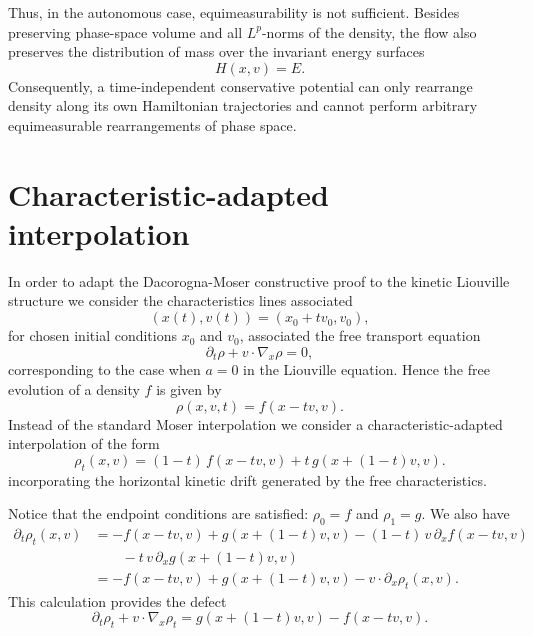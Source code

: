 \documentclass[11pt]{article}
\begin{document}
Thus, in the autonomous case, equimeasurability is not sufficient. Besides
preserving phase-space volume and all \(L^p\)-norms of the density, the flow
also preserves the distribution of mass over the invariant energy surfaces
\[
        H(x,v)=E .
\]
Consequently, a time-independent conservative potential can only rearrange
density along its own Hamiltonian trajectories and cannot perform arbitrary
equimeasurable rearrangements of phase space.




\section{Characteristic-adapted interpolation}
%
In order to adapt the
Dacorogna-Moser constructive proof to 
the kinetic Liouville structure we consider the characteristics lines associated 
\[
        (x(t),v(t))=(x_0+t v_0,v_0) ,
\]
for chosen initial conditions $x_0$ and $v_0$,
associated 
the free transport
equation
\[
        \partial_t\rho+v\cdot\nabla_x\rho=0,
\]
corresponding to the case 
when \(a=0\) in the Liouville equation.
 Hence the free evolution of a density \(f\) is given by 
\[
        \rho(x,v,t)=f(x-tv,v).
\]
Instead of the standard Moser interpolation
we consider a
characteristic-adapted interpolation of the form
\begin{equation}
    \rho_t(x,v) = (1-t) \, f(x-tv,v) +  t \, g(x+(1-t)v,v).
    \label{newInterpolation}
\end{equation}
incorporating the
horizontal kinetic drift generated by the free characteristics. 

Notice that the endpoint conditions are satisfied: $\rho_0=f$ and $ \rho_1=g$. 
We also have
\begin{align*}
   \partial_t  \rho_t(x,v) & = - f(x-tv,v) +  g(x+(1-t)v,v) 
   - (1-t) \, v \, \partial_x f(x-tv,v) \\
   & \qquad -  t \, v \, \partial_x g(x+(1-t)v,v) \\
   & = - f(x-tv,v) +  g(x+(1-t)v,v)  - v \cdot \partial_x \rho_t (x,v) .
\end{align*}
This calculation provides the defect
\begin{equation}\label{defect}
\partial_t\rho_t+v\cdot\nabla_x\rho_t = g(x+(1-t)v,v) - f(x-tv,v) .
\end{equation}



\medskip

\end{document}
